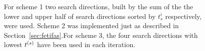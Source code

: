 \begin{figure}[h!]
  \begin{center}
    
    \caption[Results for the proposed FETI-FAS schemes]{For scheme 1 two search directions, built by the sum of the the lower and upper half of search directions sorted by $t_s^i$ respectively, were used. Scheme 2 was implemented just as described in Section~\ref{sec:fetifas}.For scheme 3, the four search directions with lowest ${t}^{(s)}$ have been used in each iteration. }
    \label{fig:fetifas_schemes}
  \end{center}
\end{figure}






